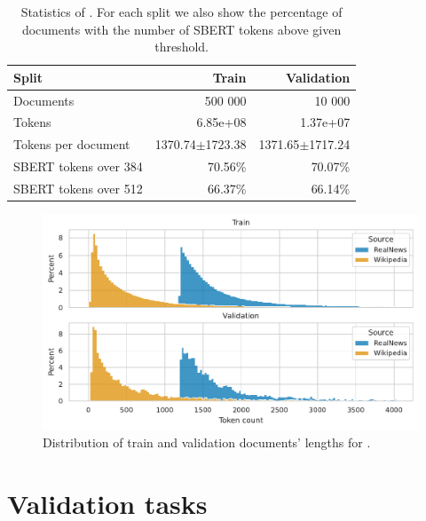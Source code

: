 \begin{table}
  \centering
  \footnotesize

  \begin{tabular}{lrr}
    \toprule
      Split & Train & Validation \\
    \midrule
      Documents & 500 000 & 10 000 \\
      Tokens & 6.85e+08 & 1.37e+07 \\
      Tokens per document & 1370.74$\pm$1723.38 & 1371.65$\pm$1717.24 \\
      SBERT tokens over 384 & 70.56\% & 70.07\% \\
      SBERT tokens over 512 & 66.37\% & 66.14\% \\
    \bottomrule
  \end{tabular}

  \caption{Statistics of . For each split we also show the
  percentage of documents with the number of SBERT tokens above given
  threshold.}

  \label{table:val_data_stats}

\end{table}

\begin{figure}

  \includegraphics[width=\textwidth]{./img/val_data_dist.pdf}

  \caption{Distribution of train and validation documents' lengths for
  .}

  \label{fig:val_data_dist}

\end{figure}

\section{Validation tasks}\label{section:validation_tasks}

